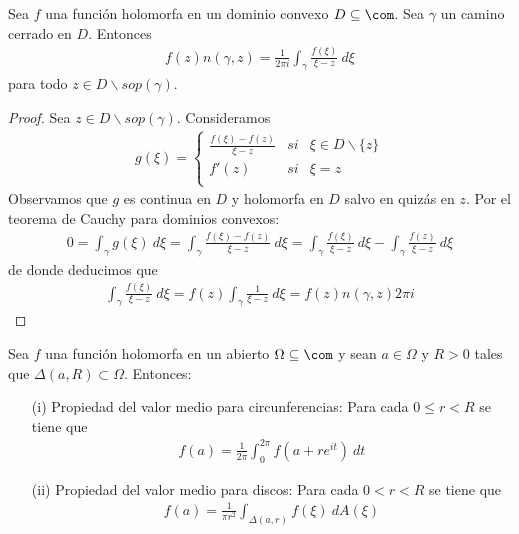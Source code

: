 \begin{teo}
Sea $f$ una función holomorfa en un dominio convexo $D \subseteq \com$. Sea $\gamma$ un camino cerrado en $D$. Entonces
\begin{align*}
    f(z)n(\gamma,z) = \frac{1}{2\pi i}\int_{\gamma}{\frac{f(\xi)}{\xi - z} \ d\xi}
\end{align*}
para todo $z \in D \backslash sop(\gamma)$.
\end{teo}

\begin{proof}
Sea $z \in D \backslash sop(\gamma)$. Consideramos 
\begin{align*}
    g(\xi) = \left\{ \begin{array}{lcc}
             \frac{f(\xi) - f(z)}{\xi - z} &  si  & \xi \in D \backslash \{z\}\\
             f'(z) &  si & \xi = z \\
             \end{array}
   \right.
\end{align*}
Observamos que $g$ es continua en $D$ y holomorfa en $D$ salvo en quizás en $z$. Por el teorema de Cauchy para dominios convexos:
\begin{align*}
    0 = \int_{\gamma}{g(\xi) \ d\xi} = \int_{\gamma}{\frac{f(\xi) - f(z)}{\xi - z} \ d\xi} = \int_{\gamma}{\frac{f(\xi)}{\xi - z} \ d\xi} - \int_{\gamma}{\frac{f(z)}{\xi - z} \ d\xi} 
\end{align*}
de donde deducimos que
\begin{align*}
    \int_{\gamma}{\frac{f(\xi)}{\xi - z} \ d\xi} = f(z)\int_{\gamma}{\frac{1}{\xi - z} \ d\xi} = f(z)n(\gamma,z)2\pi i
\end{align*}
\end{proof}

\begin{teo}
Sea $f$ una función holomorfa en un abierto $\Omega \subseteq \com$ y sean $a \in \Omega$ y $R > 0$ tales que $\Delta(a,R) \subset \Omega$. Entonces:
\begin{enumerate}
    \item[(i)] Propiedad del valor medio para circunferencias: Para cada $0 \leq r < R$ se tiene que
    \begin{align*}
        f(a) = \frac{1}{2\pi}\int_{0}^{2\pi}{f\left(a + re^{it}\right) \ dt}
    \end{align*}
    \item[(ii)] Propiedad del valor medio para discos: Para cada $0 < r < R$ se tiene que
    \begin{align*}
        f(a) = \frac{1}{\pi r^2}\int_{\Delta(a,r)}{f(\xi) \ dA(\xi)}
    \end{align*}
\end{enumerate}
\end{teo}

